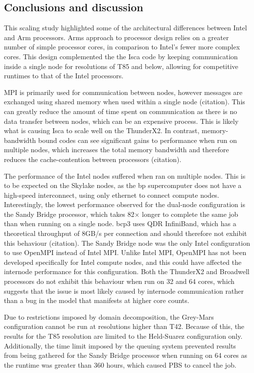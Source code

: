 \documentclass[a4paper,11pt]{report}
\begin{document}
\subsection{Conclusions and discussion}
This scaling study highlighted some of the architectural differences between Intel and Arm processors. Arms approach to processor design relies on a greater number of simple processor cores, in comparison to Intel's fewer more complex cores. This design complemented the the Isca code by keeping communication inside a single node for resolutions of T85 and below, allowing for competitive runtimes to that of the Intel processors. 
\par
MPI is primarily used for communication between nodes, however messages are exchanged using shared memory when used within a single node (citation). This can greatly reduce the amount of time spent on communication as there is no data transfer between nodes, which can be an expensive process. This is likely what is causing Isca to scale well on the ThunderX2. In contrast, memory-bandwidth bound codes can see significant gains to performance when run on multiple nodes, which increases the total memory bandwidth and therefore reduces the cache-contention between processors (citation).
\par
The performance of the Intel nodes suffered when ran on multiple nodes. This is to be expected on the Skylake nodes, as the \gls{bp} supercomputer does not have a high-speed interconnect, using only ethernet to connect compute nodes. Interestingly, the lowest performance observed for the dual-node configuration is the Sandy Bridge processor, which takes 82$\times$ longer to complete the same job than when running on a single node. \gls{bcp3} uses QDR InfiniBand, which has a theoretical throughput of 8GB/s per connection and should therefore not exhibit this behaviour (citation). The Sandy Bridge node was the only Intel configuration to use OpenMPI instead of Intel MPI. Unlike Intel MPI, OpenMPI has not been developed specifically for Intel compute nodes, and this could have affected the internode performance for this configuration. Both the ThunderX2 and Broadwell processors do not exhibit this behaviour when run on 32 and 64 cores, which suggests that the issue is most likely caused by internode communication rather than a bug in the model that manifests at higher core counts.
\par
Due to restrictions imposed by domain decomposition, the Grey-Mars configuration cannot be run at resolutions higher than T42. Because of this, the results for the T85 resolution are limited to the Held-Suarez configuration only. Additionally, the time limit imposed by the queuing system prevented results from being gathered for the Sandy Bridge processor when running on 64 cores as the runtime was greater than 360 hours, which caused PBS to cancel the job. 
\end{document}
